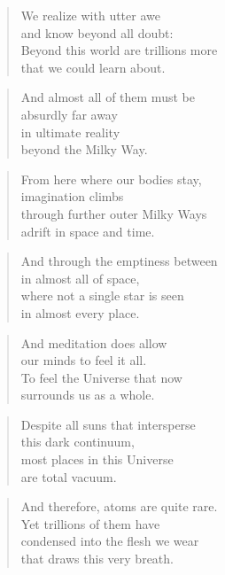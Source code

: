 \documentclass[14pt,a4paper]{article}
\begin{document}
\begin{verse}
We realize with utter awe\\
and know beyond all doubt:\\
Beyond this world are trillions more\\
that we could learn about.
\end{verse}

\begin{verse}
And almost all of them must be\\
absurdly far away\\
in ultimate reality\\
beyond the Milky Way.
\end{verse}

\begin{verse}
From here where our bodies stay,\\
imagination climbs\\
through further outer Milky Ways\\
adrift in space and time.
\end{verse}

\begin{verse}
And through the emptiness between\\
in almost all of space,\\
where not a single star is seen\\
in almost every place.
\end{verse}

\begin{verse}
And meditation does allow\\
our minds to feel it all.\\
To feel the Universe that now\\
surrounds us as a whole.
\end{verse}

\begin{verse}
Despite all suns that intersperse\\
this dark continuum,\\
most places in this Universe\\
are total vacuum.
\end{verse}

\begin{verse}
And therefore, atoms are quite rare.\\
Yet trillions of them have\\
condensed into the flesh we wear\\
that draws this very breath.
\end{verse}
\end{document}
